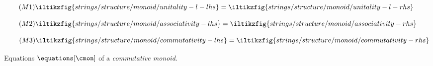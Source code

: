 \begin{figure}[p]
    \centering
    \begin{minipage}{0.21\textwidth}
        \begin{equation}
            \tag{\(\mathsf{M1}\)}
            \iltikzfig{strings/structure/monoid/unitality-l-lhs}
            =
            \iltikzfig{strings/structure/monoid/unitality-l-rhs}
            \label{eq:monoid-unitality-l}
        \end{equation}
    \end{minipage}
    \begin{minipage}{0.26\textwidth}
        \begin{equation}
            \tag{\(\mathsf{M2}\)}
            \iltikzfig{strings/structure/monoid/associativity-lhs}
            =
            \iltikzfig{strings/structure/monoid/associativity-rhs}
            \label{eq:monoid-associativity}
        \end{equation}
    \end{minipage}
    \begin{minipage}{0.26\textwidth}
        \begin{equation}
            \tag{\(\mathsf{M3}\)}
            \iltikzfig{strings/structure/monoid/commutativity-lhs}
            =
            \iltikzfig{strings/structure/monoid/commutativity-rhs}
            \label{eq:monoid-commutativity}
        \end{equation}
    \end{minipage}
    \caption{Equations \(\equations[\cmon]\) of a \emph{commutative monoid}.}
    \label{fig:monoid-equations}
\end{figure}
